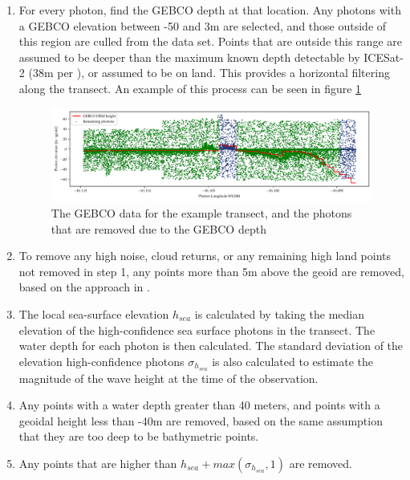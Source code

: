 \begin{enumerate}
    \item For every photon, find the GEBCO depth at that location. Any photons with a GEBCO elevation between -50 and 3m are selected, and those outside of this region are culled from the data set. Points that are outside this range are assumed to be deeper than the maximum known depth detectable by ICESat-2 (38m per \citeauthor{Parrish2019}), or assumed to be on land. This provides a horizontal filtering along the transect. An example of this process can be seen in figure \ref{fig:gebco_filtering}
    
    \begin{figure}[h]
        \centering
        \includegraphics[width=\textwidth]{figures/methodology_gebco_filtering.pdf}
        \caption{The GEBCO data for the example transect, and the photons that are removed due to the GEBCO depth}
        \label{fig:gebco_filtering}
    \end{figure}

    \item To remove any high noise, cloud returns, or any remaining high land points not removed in step 1, any points more than 5m above the geoid are removed, based on the approach in \citeauthor{Ranndal2021}.
    \item The local sea-surface elevation $h_{sea}$ is calculated by taking the median elevation of the  high-confidence sea surface photons in the transect. The water depth for each photon is then calculated. The standard deviation of the elevation high-confidence photons $\sigma_{h_{sea}}$ is also calculated to estimate the magnitude of the wave height at the time of the observation.
    \item Any points with a water depth greater than 40 meters, and points with a geoidal height  less than -40m are removed, based on the same assumption that they are too deep to be bathymetric points. 
    \item Any points that are higher than $h_{sea} + max(\sigma_{h_{sea}},1)$ are removed. 
    

\end{enumerate}
